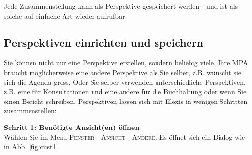 Jede Zusammenstellung kann als Perspektive gespeichert werden - und ist als
solche auf einfache Art wieder aufrufbar.

\subsection{Perspektiven einrichten und speichern}
Sie können nicht nur eine Perspektive erstellen, sondern beliebig viele. Ihre MPA braucht möglicherweise eine
andere Perspektive als Sie selber, z.B. wünscht sie sich die Agenda gross. Oder Sie selber verwenden unterschiedliche
Perspektiven, z.B. eine für Konsultationen und eine andere für die Buchhaltung oder wenn
Sie einen Bericht schreiben. Perspektiven lassen sich mit Elexis in wenigen Schritten zusammenstellen:\\

\bigskip

\textbf{Schritt 1: Benötigte Ansicht(en) öffnen}\\

Wählen Sie im Menu \textsc{Fenster - Ansicht - Andere}. Es öffnet sich ein Dialog wie in Abb. \ref{fig:cust1}.\\

